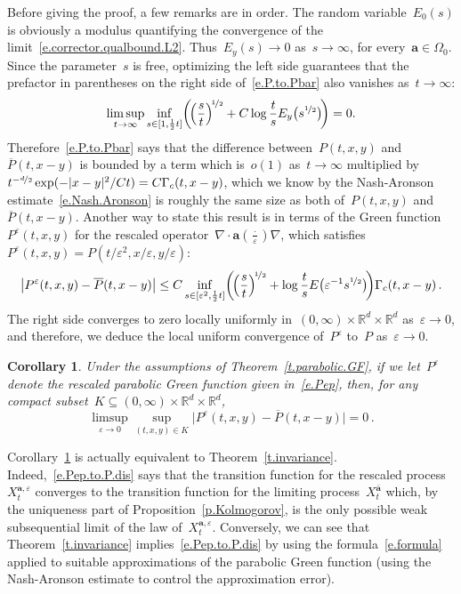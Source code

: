 \documentclass[11pt,twoside]{article} %
\numberwithin{equation}{section}
\newtheorem{corollary}[theorem]{Corollary}
\theoremstyle{definition}
\newcommand*{\Rd}{\ensuremath{\mathbb{R}^d}}
\newcommand{\eps}{\varepsilon}
\newcommand{\ep}{\eps}
\renewcommand{\a}{\mathbf{a}}
\newcommand{\ahom}{\bar{\a}}
\begin{document}
Before giving the proof, a few remarks are in order. The random variable~$E_0(s)$ is obviously a modulus quantifying the convergence of the limit~\eqref{e.corrector.qualbound.L2}. Thus~$E_y(s) \to 0$ as~$s \to \infty$, for every~$\a \in\Omega_0$. Since the parameter~$s$ is free, optimizing the left side guarantees that the prefactor in parentheses on the right side of~\eqref{e.P.to.Pbar} also vanishes as~$t \to \infty$:
\begin{equation*}
\limsup_{t\to \infty} 
\inf_{s \in [1, \frac12 t] } 
\biggl ( \!
\Bigl(  \frac{s}{t} \Bigr)^{\!\nicefrac12}
+
C  \log \frac{t}{s} 
E_y\bigl(s^{\nicefrac12}\bigr) \!
\biggr )
=
0.
\end{equation*}
Therefore~\eqref{e.P.to.Pbar} says that the difference between~$P(t,x,y)$ and~$\overline{P}(t,x-y)$ is bounded by a term which is~$o(1)$ as~$t \to\infty$ multiplied by~$t^{-\nicefrac d2} \exp( - |x-y|^2/Ct) = C\Gamma_c(t,x-y)$, which we know by the Nash-Aronson estimate~\eqref{e.Nash.Aronson} is roughly the same size as both of~$P(t,x,y)$ and~$\overline{P}(t,x-y)$.
Another way to state this result is in terms of the Green function~$P^\ep(t,x,y)$ for the rescaled operator~$\nabla\cdot \a(\tfrac\cdot\ep)\nabla$, which satisfies~$P^\ep (t,x,y) = P( t/\ep^2, x/\ep, y/\ep )$:
\begin{equation}
\label{e.Pep.to.P}
\bigl| P^\ep(t,x,y) - \overline{P}(t,x-y) \bigr| 
\leq
C
\inf_{s \in [\ep^2, \frac12t]} 
\biggl ( \!
\Bigl(  \frac{s}{t} \Bigr)^{\!\nicefrac12}
+
\log \frac{t}{s} 
E\bigl( \ep^{-1} s^{\nicefrac12}\bigr) \!
\biggr )
\Gamma_c(t,x-y)
\,.
\end{equation}
The right side converges to zero locally uniformly in~$(0,\infty)\times \Rd \times \Rd$ as~$\ep \to 0$, and therefore, we deduce the local uniform convergence of~$P^\ep$ to~$P$ as~$\ep \to 0$. 


\begin{corollary}
\label{c.Pep.to.P}
Under the assumptions of Theorem~\ref{t.parabolic.GF}, if we let~$P^\ep$ denote the rescaled parabolic Green function given in~\eqref{e.Pep}, then, for any compact subset~$K \subseteq (0,\infty) \times \Rd \times \Rd$, 
\begin{equation}
\label{e.Pep.to.P.dis}
\limsup_{\ep \to 0}
\sup_{(t,x,y) \in K}  
\bigl| P^\ep (t,x,y) - \overline{P}(t,x-y) \bigr| = 0\,.
\end{equation}
\end{corollary}

Corollary~\ref{c.Pep.to.P} is actually equivalent to  Theorem~\ref{t.invariance}. Indeed,~\eqref{e.Pep.to.P.dis} says that the transition function for the rescaled process~$X^{\a,\ep}_t$ converges to the transition function for the limiting process~$X^{\ahom}_t$ which, by the uniqueness part of Proposition~\ref{p.Kolmogorov}, is the only possible weak subsequential limit of the law of~$X^{\a,\ep}_t$. 
Conversely, we can see that Theorem~\ref{t.invariance} implies~\eqref{e.Pep.to.P.dis} by using the formula~\eqref{e.formula} applied to suitable approximations of the parabolic Green function (using the Nash-Aronson estimate to control the approximation error). 
\end{document}
